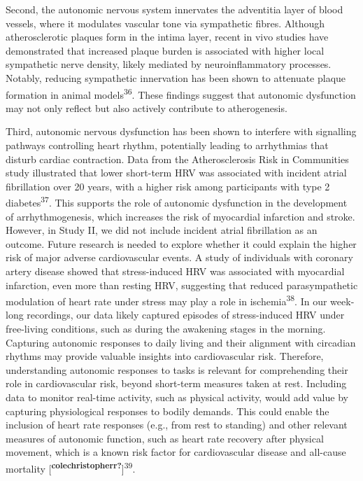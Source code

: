 \documentclass[
  a4paper,
  headsepline=true,
  open=any]{scrbook}
\begin{document}
Second, the autonomic nervous system innervates the adventitia layer of
blood vessels, where it modulates vascular tone via sympathetic fibres.
Although atherosclerotic plaques form in the intima layer, recent in
vivo studies have demonstrated that increased plaque burden is
associated with higher local sympathetic nerve density, likely mediated
by neuroinflammatory processes. Notably, reducing sympathetic
innervation has been shown to attenuate plaque formation in animal
models\textsuperscript{36}. These findings suggest that autonomic
dysfunction may not only reflect but also actively contribute to
atherogenesis.

Third, autonomic nervous dysfunction has been shown to interfere with
signalling pathways controlling heart rhythm, potentially leading to
arrhythmias that disturb cardiac contraction. Data from the
Atherosclerosis Risk in Communities study illustrated that lower
short-term HRV was associated with incident atrial fibrillation over 20
years, with a higher risk among participants with type 2
diabetes\textsuperscript{37}. This supports the role of autonomic
dysfunction in the development of arrhythmogenesis, which increases the
risk of myocardial infarction and stroke. However, in Study II, we did
not include incident atrial fibrillation as an outcome. Future research
is needed to explore whether it could explain the higher risk of major
adverse cardiovascular events. A study of individuals with coronary
artery disease showed that stress-induced HRV was associated with
myocardial infarction, even more than resting HRV, suggesting that
reduced parasympathetic modulation of heart rate under stress may play a
role in ischemia\textsuperscript{38}. In our week-long recordings, our
data likely captured episodes of stress-induced HRV under free-living
conditions, such as during the awakening stages in the morning.
Capturing autonomic responses to daily living and their alignment with
circadian rhythms may provide valuable insights into cardiovascular
risk. Therefore, understanding autonomic responses to tasks is relevant
for comprehending their role in cardiovascular risk, beyond short-term
measures taken at rest. Including data to monitor real-time activity,
such as physical activity, would add value by capturing physiological
responses to bodily demands. This could enable the inclusion of heart
rate responses (e.g., from rest to standing) and other relevant measures
of autonomic function, such as heart rate recovery after physical
movement, which is a known risk factor for cardiovascular disease and
all-cause mortality
{[}\textsuperscript{\textbf{colechristopherr?}}{]}\textsuperscript{39}.
\end{document}
